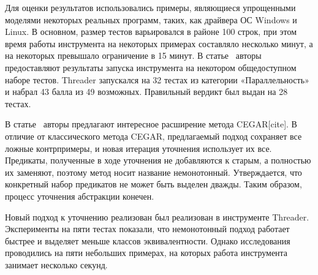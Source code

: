 Для оценки результатов использовались примеры, являющиеся упрощенными моделями некоторых реальных программ, таких, как драйвера ОС Windows и Linux. В основном, размер тестов варьировался в районе 100 строк, при этом время работы инструмента на некоторых примерах составляло несколько минут, а на некоторых превышало ограничение в 15 минут. 
В статье~\cite{Threader:svcomp} авторы предоставляют результаты запуска инструмента на некотором общедоступном наборе тестов.
Threader запускался на 32 тестах из категории «Параллельность» и набрал 43 балла из 49 возможных. Правильный вердикт был выдан на 28 тестах.

В статье~\cite{Gupta:2010} авторы предлагают интересное расширение метода CEGAR[cite]. В отличие от классического метода CEGAR, предлагаемый подход сохраняет все ложные контрпримеры, и новая итерация уточнения использует их все. Предикаты, полученные в ходе уточнения не добавляются к старым, а полностью их заменяют, поэтому метод носит название немонотонный. Утверждается, что конкретный набор предикатов не может быть выделен дважды. Таким образом, процесс уточнения абстракции конечен. 

Новый подход к уточнению реализован был реализован в инструменте Threader. Эксперименты на пяти тестах показали, что немонотонный подход работает быстрее и выделяет меньше классов эквивалентности. Однако исследования проводились на пяти небольших примерах, на которых работа инструмента занимает несколько секунд.

